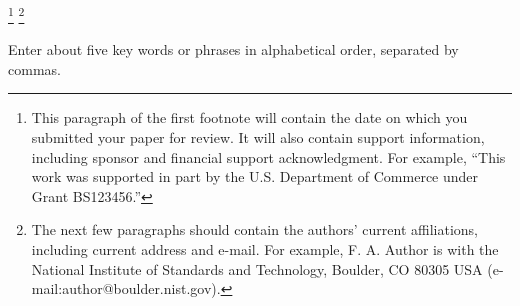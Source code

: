 \documentclass[journal,twoside,web]{ieeecolor}
\begin{document}
\title{}

\author{Georg Schramm and Martin Holler}

\thanks{This paragraph of the first footnote will contain the date on which
you submitted your paper for review. It will also contain support information,
including sponsor and financial support acknowledgment. For example, 
``This work was supported in part by the U.S. Department of Commerce under Grant BS123456.'' }
\thanks{The next few paragraphs should contain the authors' current affiliations,
including current address and e-mail. For example, F. A. Author is with the
National Institute of Standards and Technology, Boulder, CO 80305 USA (e-mail:author@boulder.nist.gov). }


\maketitle

\begin{abstract}

\end{abstract}

\begin{IEEEkeywords}
Enter about five key words or phrases in alphabetical order, separated by commas.
\end{IEEEkeywords}



\printbibliography
\end{document}
